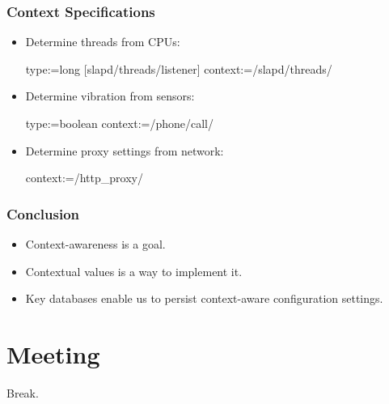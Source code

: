 \begin{frame}[fragile]
	\frametitle{Context Specifications}

	\begin{itemize}
	\item
	Determine threads from CPUs:

	\begin{code}
	  type:=long
	[slapd/threads/listener]
	  context:=/slapd/threads/%
	\end{code}

	\item
	Determine vibration from sensors:

	\begin{code}
	  type:=boolean
	  context:=/phone/call/%
	\end{code}

	\item
	Determine proxy settings from network:

	\begin{code}
	  context:=/http_proxy/%
	\end{code}
	\end{itemize}
\end{frame}


\begin{frame}
	\frametitle{Conclusion}

	\begin{itemize}[<+-| alert@+>]
	\item Context-awareness is a goal.
	\item Contextual values is a way to implement it.
	\item Key databases enable us to persist context-aware configuration settings.
	\end{itemize}
\end{frame}



\section{Meeting}


\begin{assignment}
	\begin{task}
	Break.
	\end{task}
\end{assignment}


\nocite{raab2017introducing}

\appendix

\begin{frame}[allowframebreaks]
	
	
\end{frame}



